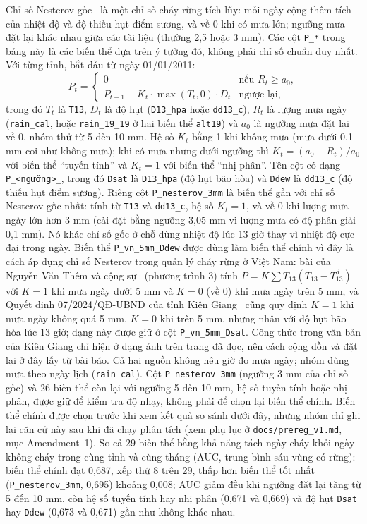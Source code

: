 \documentclass[12pt,a4paper]{article}
\begin{document}
Chỉ số Nesterov gốc~\cite{nesterov1949} là một chỉ số cháy rừng tích lũy: mỗi ngày cộng thêm tích của nhiệt độ và độ thiếu hụt điểm sương, và về 0 khi có mưa lớn; ngưỡng mưa đặt lại khác nhau giữa các tài liệu (thường 2,5 hoặc 3 mm). Các cột \texttt{P\_*} trong bảng này là các biến thể dựa trên ý tưởng đó, không phải chỉ số chuẩn duy nhất. Với từng tỉnh, bắt đầu từ ngày 01/01/2011:
\[
P_t = \begin{cases}
0 & \text{nếu } R_t \ge a_0,\\
P_{t-1} + K_t \cdot \max(T_t,0)\cdot D_t & \text{ngược lại,}
\end{cases}
\]
trong đó $T_t$ là \texttt{T13}, $D_t$ là độ hụt (\texttt{D13\_hpa} hoặc \texttt{dd13\_c}), $R_t$ là lượng mưa ngày (\texttt{rain\_cal}, hoặc \texttt{rain\_19\_19} ở hai biến thể \texttt{alt19}) và $a_0$ là ngưỡng mưa đặt lại về 0, nhóm thử từ 5 đến 10 mm. Hệ số $K_t$ bằng 1 khi không mưa (mưa dưới 0,1 mm coi như không mưa); khi có mưa nhưng dưới ngưỡng thì $K_t = (a_0-R_t)/a_0$ với biến thể ``tuyến tính'' và $K_t = 1$ với biến thể ``nhị phân''. Tên cột có dạng \texttt{P\_<hệ số><ngưỡng>\_<độ hụt>}, trong đó \texttt{Dsat} là \texttt{D13\_hpa} (độ hụt bão hòa) và \texttt{Ddew} là \texttt{dd13\_c} (độ thiếu hụt điểm sương). Riêng cột \texttt{P\_nesterov\_3mm} là biến thể gần với chỉ số Nesterov gốc nhất: tính từ \texttt{T13} và \texttt{dd13\_c}, hệ số $K_t = 1$, và về 0 khi lượng mưa ngày lớn hơn 3 mm (cài đặt bằng ngưỡng 3,05 mm vì lượng mưa có độ phân giải 0,1 mm). Nó khác chỉ số gốc ở chỗ dùng nhiệt độ lúc 13 giờ thay vì nhiệt độ cực đại trong ngày. Biến thể \texttt{P\_vn\_5mm\_Ddew} được dùng làm biến thể chính vì đây là cách áp dụng chỉ số Nesterov trong quản lý cháy rừng ở Việt Nam: bài của Nguyễn Văn Thêm và cộng sự~\cite{them2024} (phương trình 3) tính $P=K\sum T_{13}(T_{13}-T^{d}_{13})$ với $K=1$ khi mưa ngày dưới 5 mm và $K=0$ (về 0) khi mưa ngày trên 5 mm, và Quyết định 07/2024/QĐ-UBND của tỉnh Kiên Giang~\cite{kiengiang2024} cũng quy định $K=1$ khi mưa ngày không quá 5 mm, $K=0$ khi trên 5 mm, nhưng nhân với độ hụt bão hòa lúc 13 giờ; dạng này được giữ ở cột \texttt{P\_vn\_5mm\_Dsat}. Công thức trong văn bản của Kiên Giang chỉ hiện ở dạng ảnh trên trang đã đọc, nên cách cộng dồn và đặt lại ở đây lấy từ bài báo. Cả hai nguồn không nêu giờ đo mưa ngày; nhóm dùng mưa theo ngày lịch (\texttt{rain\_cal}). Cột \texttt{P\_nesterov\_3mm} (ngưỡng 3 mm của chỉ số gốc) và 26 biến thể còn lại với ngưỡng 5 đến 10 mm, hệ số tuyến tính hoặc nhị phân, được giữ để kiểm tra độ nhạy, không phải để chọn lại biến thể chính. Biến thể chính được chọn trước khi xem kết quả so sánh dưới đây, nhưng nhóm chỉ ghi lại căn cứ này sau khi đã chạy phân tích (xem phụ lục ở \texttt{docs/prereg\_v1.md}, mục Amendment~1). So cả 29 biến thể bằng khả năng tách ngày cháy khỏi ngày không cháy trong cùng tỉnh và cùng tháng (AUC, trung bình sáu vùng có rừng): biến thể chính đạt 0,687, xếp thứ 8 trên 29, thấp hơn biến thể tốt nhất (\texttt{P\_nesterov\_3mm}, 0,695) khoảng 0,008; AUC giảm đều khi ngưỡng đặt lại tăng từ 5 đến 10 mm, còn hệ số tuyến tính hay nhị phân (0,671 và 0,669) và độ hụt \texttt{Dsat} hay \texttt{Ddew} (0,673 và 0,671) gần như không khác nhau.
\end{document}
